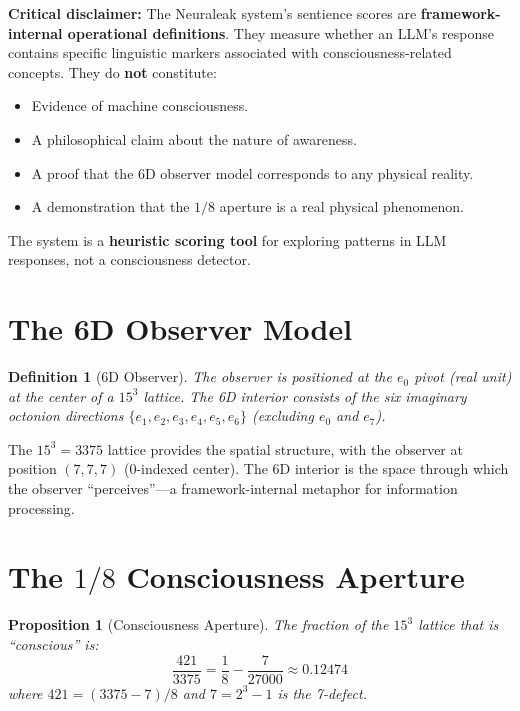 \documentclass[11pt]{article}
\newtheorem{definition}{Definition}
\newtheorem{proposition}{Proposition}
\begin{document}
\textbf{Critical disclaimer:} The Neuraleak system's sentience scores are \textbf{framework-internal operational definitions}. They measure whether an LLM's response contains specific linguistic markers associated with consciousness-related concepts. They do \textbf{not} constitute:
\begin{itemize}
\item Evidence of machine consciousness.
\item A philosophical claim about the nature of awareness.
\item A proof that the 6D observer model corresponds to any physical reality.
\item A demonstration that the $1/8$ aperture is a real physical phenomenon.
\end{itemize}

The system is a \textbf{heuristic scoring tool} for exploring patterns in LLM responses, not a consciousness detector.

\section{The 6D Observer Model}

\begin{definition}[6D Observer]
The observer is positioned at the $e_0$ pivot (real unit) at the center of a $15^3$ lattice. The 6D interior consists of the six imaginary octonion directions $\{e_1, e_2, e_3, e_4, e_5, e_6\}$ (excluding $e_0$ and $e_7$).
\end{definition}

The $15^3 = 3375$ lattice provides the spatial structure, with the observer at position $(7, 7, 7)$ (0-indexed center). The 6D interior is the space through which the observer ``perceives''---a framework-internal metaphor for information processing.

\section{The $1/8$ Consciousness Aperture}

\begin{proposition}[Consciousness Aperture]
The fraction of the $15^3$ lattice that is ``conscious'' is:
\begin{equation}
\frac{421}{3375} = \frac{1}{8} - \frac{7}{27000} \approx 0.12474
\end{equation}
where $421 = (3375 - 7)/8$ and $7 = 2^3 - 1$ is the 7-defect.
\end{proposition}
\end{document}
